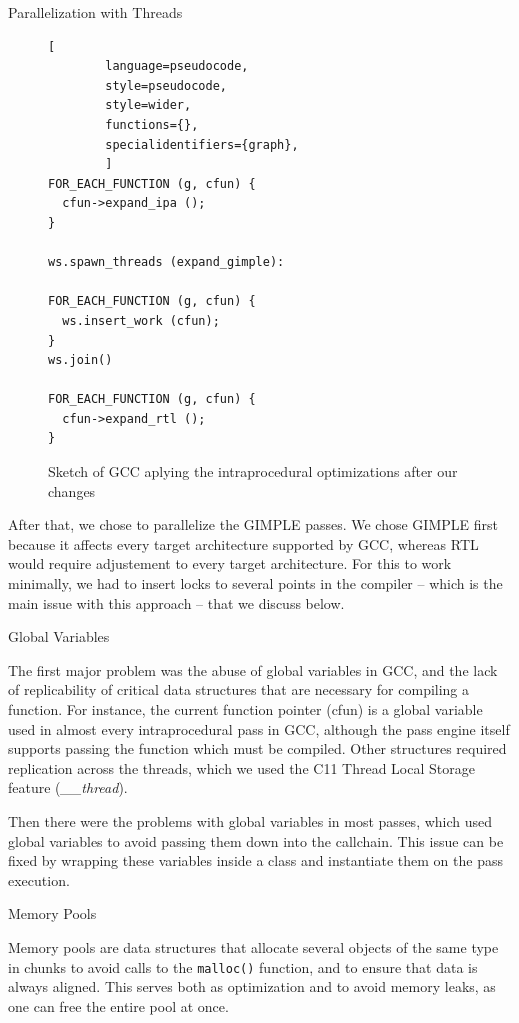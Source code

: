 \begin{section}{Parallelization with Threads}
\begin{figure}[ht]
\begin{center}
\begin{lstlisting}[
		language=pseudocode,
		style=pseudocode,
		style=wider,
		functions={},
		specialidentifiers={graph},
		]
FOR_EACH_FUNCTION (g, cfun) {
  cfun->expand_ipa ();
}

ws.spawn_threads (expand_gimple):

FOR_EACH_FUNCTION (g, cfun) {
  ws.insert_work (cfun);
}
ws.join()

FOR_EACH_FUNCTION (g, cfun) {
  cfun->expand_rtl ();
}
	\end{lstlisting}
	\end{center}
\caption{Sketch of GCC aplying the intraprocedural optimizations after our changes}
\label{fig:intraprocedural_sketch_after}
\end{figure}

After that, we chose to parallelize the GIMPLE passes. We chose GIMPLE first because
it affects every target architecture supported by GCC, whereas RTL would require
adjustement to every target architecture. For this to work minimally, we had to
insert locks to several points in the compiler -- which is the main issue with
this approach -- that we discuss below.

\begin{subsection}{Global Variables}

The first major problem was the abuse of global variables in GCC, and the lack
of replicability of critical data structures that are necessary for compiling a
function. For instance, the current function pointer (cfun) is a global
variable used in almost every intraprocedural pass in GCC, although the pass
engine itself supports passing the function which must be compiled. Other
structures required replication across the threads, which we used the C11
Thread Local Storage feature (\textit{\_\_thread}).

Then there were the problems with global variables in most passes, which used
global variables to avoid passing them down into the callchain. This issue can
be fixed by wrapping these variables inside a class and instantiate them on the
pass execution.

\end{subsection}

\begin{subsection}{Memory Pools}

Memory pools are data structures that allocate several objects of the same type
in chunks to avoid calls to the \texttt{malloc()} function, and to ensure that data is
always aligned. This serves both as optimization and to avoid memory leaks, as
one can free the entire pool at once. 


\end{subsection}
\end{section}
